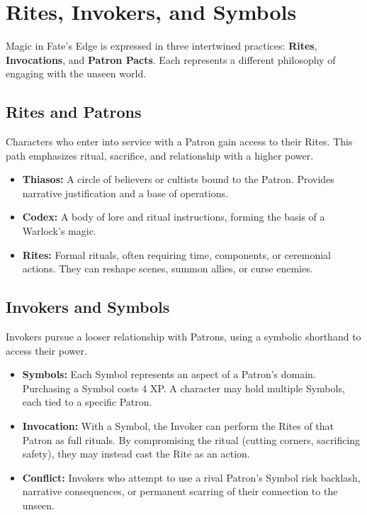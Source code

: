 
\section{Rites, Invokers, and Symbols}
\label{sec:rites}

Magic in Fate's Edge is expressed in three intertwined practices: \textbf{Rites}, \textbf{Invocations}, and \textbf{Patron Pacts}. Each represents a different philosophy of engaging with the unseen world.

\subsection{Rites and Patrons}
Characters who enter into service with a Patron gain access to their Rites. This path emphasizes ritual, sacrifice, and relationship with a higher power.

\begin{itemize}
    \item \textbf{Thiasos:} A circle of believers or cultists bound to the Patron. Provides narrative justification and a base of operations.
    \item \textbf{Codex:} A body of lore and ritual instructions, forming the basis of a Warlock’s magic.
    \item \textbf{Rites:} Formal rituals, often requiring time, components, or ceremonial actions. They can reshape scenes, summon allies, or curse enemies.
\end{itemize}

\subsection{Invokers and Symbols}
Invokers pursue a looser relationship with Patrons, using a symbolic shorthand to access their power.

\begin{itemize}
    \item \textbf{Symbols:} Each Symbol represents an aspect of a Patron’s domain. Purchasing a Symbol costs 4 XP. A character may hold multiple Symbols, each tied to a specific Patron.
    \item \textbf{Invocation:} With a Symbol, the Invoker can perform the Rites of that Patron as full rituals. By compromising the ritual (cutting corners, sacrificing safety), they may instead cast the Rite as an action.
    \item \textbf{Conflict:} Invokers who attempt to use a rival Patron’s Symbol risk backlash, narrative consequences, or permanent scarring of their connection to the unseen.
\end{itemize}

